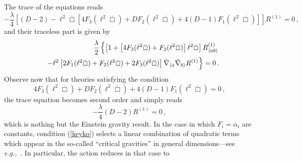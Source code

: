 \documentclass[11pt]{article}
\newcommand{\bea}{\begin{eqnarray}}
\newcommand{\eea}{\end{eqnarray}}
\newcommand{\be}{\begin{equation}}
\newcommand{\ee}{\end{equation} }
\newcommand{\eg}{{\it e.g.,}\ }
\newcommand{\comment}[1]{{\bf [[[#1]]]}}
\begin{document}
 The trace of the equations reads
\be
-\frac{\lambda}{4} \left[(D-2)-\ell^2 \bar \Box  \left[4F_3(\ell^2 \bar \Box)+D F_2(\ell^2\bar \Box)+4(D-1)F_1(\ell^2 \bar\Box) \right] \right] R^{(1)}=0\, ,
\ee
and their traceless part is given by
\bea\notag
&&
\frac{\lambda}{2} \left\{  \left[1+\left[4F_3(\ell^2 \bar \Box)+F_2(\ell^2 \bar \Box)\right]\ell^2\bar\Box \right] R^{(1)}_{\langle a b\rangle }\right. \\ && \left.- \ell^2\left[ 2F_1(\ell^2 \bar \Box)+F_2(\ell^2 \bar \Box)+2F_3(\ell^2 \bar \Box)\right] \bar\nabla_{\langle a}\bar\nabla_{b\rangle}R^{(1)} \right\}=0\, .
\eea
Observe now that for theories satisfying the condition
%
\begin{equation}\label{keyko}
4F_3(\ell^2 \bar \Box)+D F_2(\ell^2\bar \Box)+4(D-1)F_1(\ell^2 \bar\Box)=0\, ,
\end{equation}
the trace equation becomes second order and simply reads
\begin{equation}\label{oop}
-\frac{\lambda}{4}(D-2) R^{(1)}=0\, ,
\end{equation}
which is nothing but the Einstein gravity result. In the case in which $F_i=\alpha_i$ are constants, condition (\ref{keyko}) selects a linear combination of quadratic terms which appear in the so-called ``critical gravities'' in general dimensions---see \eg \cite{Lu:2011zk,Maldacena:2011mk,Bergshoeff:2009hq,Oliva:2011xu,Hassan:2013pca,Kan:2013moa,Anastasiou:2016jix}. In particular, the action reduces in that case to
\end{document}
